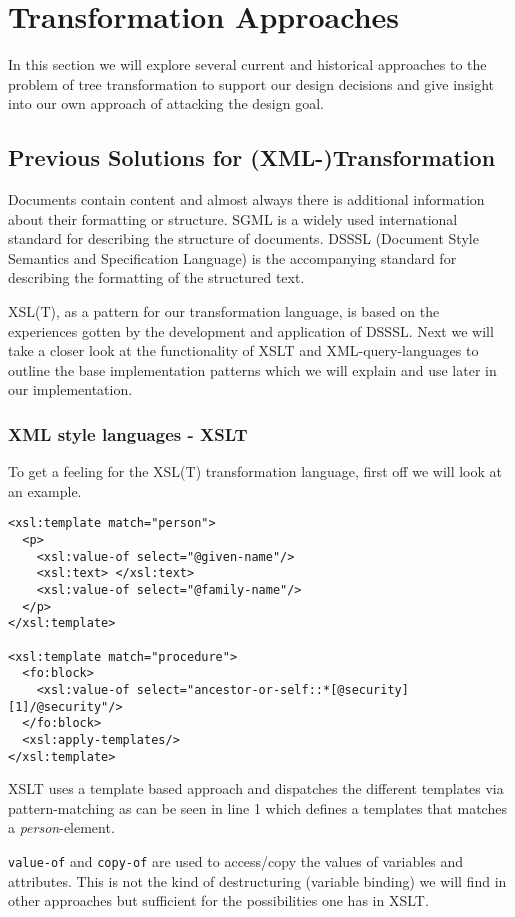 \documentclass[a4paper,11pt]{scrartcl}
\begin{document}
\section{Transformation Approaches}
In this section we will explore several current and historical
approaches to the problem of tree transformation to support our design
decisions and give insight into our own approach of attacking the
design goal.

\subsection{Previous Solutions for (XML-)Transformation}
Documents contain content and almost always there is additional
information about their formatting or structure. SGML is a widely used 
international standard for describing the structure of documents. DSSSL 
(Document Style Semantics and Specification Language) is the
accompanying standard for describing the formatting of the structured
text.

XSL(T), as a pattern for our transformation language, is based on the
experiences gotten by the development and application of DSSSL. Next we 
will take a closer look at the functionality of XSLT and
XML-query-languages to outline the base implementation patterns which 
we will explain and use later in our implementation.

\subsubsection{XML style languages - XSLT}
To get a feeling for the XSL(T) transformation language, first off we
will look at an example.

\begin{verbatim}
<xsl:template match="person">
  <p>
    <xsl:value-of select="@given-name"/>
    <xsl:text> </xsl:text>
    <xsl:value-of select="@family-name"/>
  </p>
</xsl:template>

<xsl:template match="procedure">
  <fo:block>
    <xsl:value-of select="ancestor-or-self::*[@security][1]/@security"/>
  </fo:block>
  <xsl:apply-templates/>
</xsl:template>
\end{verbatim}

XSLT uses a template based approach and dispatches the different
templates via pattern-matching as can be seen in line 1 which defines
a templates that matches a {\it person}-element.

{\tt value-of} and {\tt copy-of} are used to access/copy the values of 
variables and attributes. This is not the kind of destructuring
(variable binding) we will find in other approaches but sufficient for 
the possibilities one has in XSLT.
\end{document}
